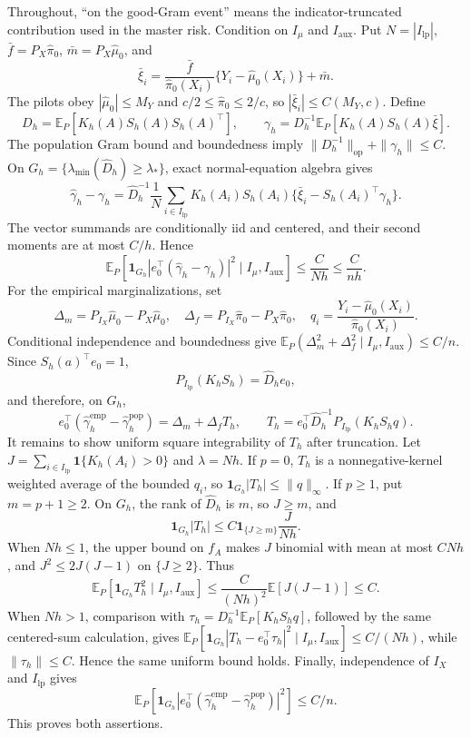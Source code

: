 Throughout, ``on the good-Gram event'' means the indicator-truncated contribution used in the master risk.  Condition on \(I_\mu\) and \(I_{\mathrm{aux}}\).  Put \(N=|I_{\mathrm{lp}}|\), \(\bar f=P_X\widehat\pi_0\), \(\bar m=P_X\widehat\mu_0\), and
\[
\bar\xi_i=\frac{\bar f}{\widehat\pi_0(X_i)}\{Y_i-\widehat\mu_0(X_i)\}+\bar m.
\]
The pilots obey \(|\widehat\mu_0|\le M_Y\) and \(c/2\le\widehat\pi_0\le2/c\), so \(|\bar\xi_i|\le C(M_Y,c)\).  Define
\[
D_h=\mathbb E_P[K_h(A)S_h(A)S_h(A)^\top],
\qquad
\gamma_h=D_h^{-1}\mathbb E_P[K_h(A)S_h(A)\bar\xi].
\]
The population Gram bound and boundedness imply \(\|D_h^{-1}\|_{\mathrm{op}}+\|\gamma_h\|\le C\).  On \(G_h=\{\lambda_{\min}(\widehat D_h)\ge\lambda_*\}\), exact normal-equation algebra gives
\[
\widehat\gamma_h-\gamma_h
=\widehat D_h^{-1}\frac1N\sum_{i\in I_{\mathrm{lp}}}
K_h(A_i)S_h(A_i)\{\bar\xi_i-S_h(A_i)^\top\gamma_h\}.
\]
The vector summands are conditionally iid and centered, and their second moments are at most \(C/h\).  Hence
\[
\mathbb E_P[\mathbf1_{G_h}|e_0^\top(\widehat\gamma_h-\gamma_h)|^2\mid I_\mu,I_{\mathrm{aux}}]
\le\frac{C}{Nh}\le\frac{C}{nh}.
\]
For the empirical marginalizations, set
\[
\Delta_m=P_{I_X}\widehat\mu_0-P_X\widehat\mu_0,
\quad
\Delta_f=P_{I_X}\widehat\pi_0-P_X\widehat\pi_0,
\quad
q_i=\frac{Y_i-\widehat\mu_0(X_i)}{\widehat\pi_0(X_i)}.
\]
Conditional independence and boundedness give \(\mathbb E_P(\Delta_m^2+\Delta_f^2\mid I_\mu,I_{\mathrm{aux}})\le C/n\).  Since \(S_h(a)^\top e_0=1\),
\[
P_{I_{\mathrm{lp}}}(K_hS_h)=\widehat D_he_0,
\]
and therefore, on \(G_h\),
\[
e_0^\top(\widehat\gamma_h^{\mathrm{emp}}-\widehat\gamma_h^{\mathrm{pop}})
=\Delta_m+\Delta_fT_h,
\qquad
T_h=e_0^\top\widehat D_h^{-1}P_{I_{\mathrm{lp}}}(K_hS_hq).
\]
It remains to show uniform square integrability of \(T_h\) after truncation.  Let \(J=\sum_{i\in I_{\mathrm{lp}}}\mathbf1\{K_h(A_i)>0\}\) and \(\lambda=Nh\).  If \(p=0\), \(T_h\) is a nonnegative-kernel weighted average of the bounded \(q_i\), so \(\mathbf1_{G_h}|T_h|\le\|q\|_\infty\).  If \(p\ge1\), put \(m=p+1\ge2\).  On \(G_h\), the rank of \(\widehat D_h\) is \(m\), so \(J\ge m\), and
\[
\mathbf1_{G_h}|T_h|
\le C\mathbf1_{\{J\ge m\}}\frac{J}{Nh}.
\]
When \(Nh\le1\), the upper bound on \(f_A\) makes \(J\) binomial with mean at most \(CNh\), and \(J^2\le2J(J-1)\) on \(\{J\ge2\}\).  Thus
\[
\mathbb E_P[\mathbf1_{G_h}T_h^2\mid I_\mu,I_{\mathrm{aux}}]
\le\frac{C}{(Nh)^2}\mathbb E[J(J-1)]\le C.
\]
When \(Nh>1\), comparison with \(\tau_h=D_h^{-1}\mathbb E_P[K_hS_hq]\), followed by the same centered-sum calculation, gives \(\mathbb E_P[\mathbf1_{G_h}|T_h-e_0^\top\tau_h|^2\mid I_\mu,I_{\mathrm{aux}}]\le C/(Nh)\), while \(\|\tau_h\|\le C\).  Hence the same uniform bound holds.  Finally, independence of \(I_X\) and \(I_{\mathrm{lp}}\) gives
\[
\mathbb E_P[\mathbf1_{G_h}|e_0^\top(\widehat\gamma_h^{\mathrm{emp}}-\widehat\gamma_h^{\mathrm{pop}})|^2]
\le C/n.
\]
This proves both assertions.